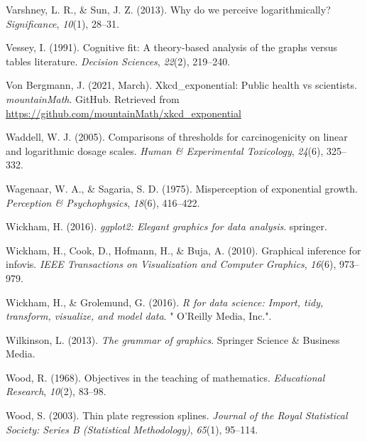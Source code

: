 \documentclass[print]{nuthesis}
\newlength{\cslhangindent}
\newenvironment{CSLReferences}[2]%
{\setlength{\parindent}{0pt}%
\everypar{\setlength{\hangindent}{\cslhangindent}}\ignorespaces}%
{\par}
\begin{document}
\begin{CSLReferences}{1}{0}
\leavevmode{}%
Varshney, L. R., \& Sun, J. Z. (2013). Why do we perceive logarithmically? \emph{Significance}, \emph{10}(1), 28--31.

\leavevmode{}%
Vessey, I. (1991). Cognitive fit: A theory-based analysis of the graphs versus tables literature. \emph{Decision Sciences}, \emph{22}(2), 219--240.

\leavevmode{}%
Von Bergmann, J. (2021, March). Xkcd\_exponential: Public health vs scientists. \emph{mountainMath}. GitHub. Retrieved from \url{https://github.com/mountainMath/xkcd_exponential}

\leavevmode{}%
Waddell, W. J. (2005). Comparisons of thresholds for carcinogenicity on linear and logarithmic dosage scales. \emph{Human \& Experimental Toxicology}, \emph{24}(6), 325--332.

\leavevmode{}%
Wagenaar, W. A., \& Sagaria, S. D. (1975). Misperception of exponential growth. \emph{Perception \& Psychophysics}, \emph{18}(6), 416--422.

\leavevmode{}%
Wickham, H. (2016). \emph{ggplot2: Elegant graphics for data analysis}. springer.

\leavevmode{}%
Wickham, H., Cook, D., Hofmann, H., \& Buja, A. (2010). Graphical inference for infovis. \emph{IEEE Transactions on Visualization and Computer Graphics}, \emph{16}(6), 973--979.

\leavevmode{}%
Wickham, H., \& Grolemund, G. (2016). \emph{R for data science: Import, tidy, transform, visualize, and model data}. " O'Reilly Media, Inc.".

\leavevmode{}%
Wilkinson, L. (2013). \emph{The grammar of graphics}. Springer Science \& Business Media.

\leavevmode{}%
Wood, R. (1968). Objectives in the teaching of mathematics. \emph{Educational Research}, \emph{10}(2), 83--98.

\leavevmode{}%
Wood, S. (2003). Thin plate regression splines. \emph{Journal of the Royal Statistical Society: Series B (Statistical Methodology)}, \emph{65}(1), 95--114.


\end{CSLReferences}
\end{document}
